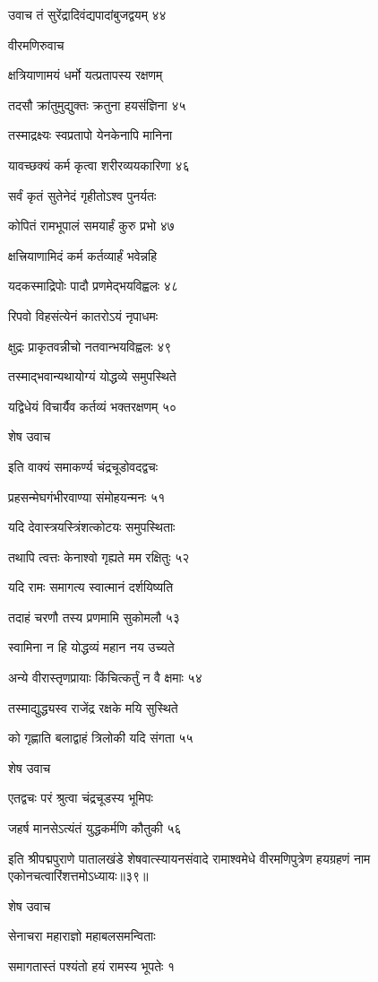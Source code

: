 उवाच तं सुरेंद्रादिवंद्यपादांबुजद्वयम् ४४

वीरमणिरुवाच

क्षत्रियाणामयं धर्मो यत्प्रतापस्य रक्षणम्

तदसौ क्रांतुमुद्युक्तः क्रतुना हयसंज्ञिना ४५

तस्माद्रक्ष्यः स्वप्रतापो येनकेनापि मानिना

यावच्छक्यं कर्म कृत्वा शरीरव्ययकारिणा ४६

सर्वं कृतं सुतेनेदं गृहीतोऽश्व पुनर्यतः

कोपितं रामभूपालं समयार्हं कुरु प्रभो ४७

क्षत्त्रियाणामिदं कर्म कर्तव्यार्हं भवेन्नहि

यदकस्माद्रिपोः पादौ प्रणमेद्भयविह्वलः ४८

रिपवो विहसंत्येनं कातरोऽयं नृपाधमः

क्षुद्रः प्राकृतवन्नीचो नतवान्भयविह्वलः ४९

तस्माद्भवान्यथायोग्यं योद्धव्ये समुपस्थिते

यद्विधेयं विचार्यैव कर्तव्यं भक्तरक्षणम् ५०

शेष उवाच

इति वाक्यं समाकर्ण्य चंद्रचूडोवदद्वचः

प्रहसन्मेघगंभीरवाण्या संमोहयन्मनः ५१

यदि देवास्त्रयस्त्रिंशत्कोटयः समुपस्थिताः

तथापि त्वत्तः केनाश्वो गृह्यते मम रक्षितुः ५२

यदि रामः समागत्य स्वात्मानं दर्शयिष्यति

तदाहं चरणौ तस्य प्रणमामि सुकोमलौ ५३

स्वामिना न हि योद्धव्यं महान नय उच्यते

अन्ये वीरास्तृणप्रायाः किंचित्कर्तुं न वै क्षमाः ५४

तस्माद्युद्ध्यस्व राजेंद्र रक्षके मयि सुस्थिते

को गृह्णाति बलाद्वाहं त्रिलोकी यदि संगता ५५

शेष उवाच

एतद्वचः परं श्रुत्वा चंद्रचूडस्य भूमिपः

जहर्ष मानसेऽत्यंतं युद्धकर्मणि कौतुकी ५६

इति श्रीपद्मपुराणे पातालखंडे शेषवात्स्यायनसंवादे रामाश्वमेधे वीरमणिपुत्रेण हयग्रहणं नाम एकोनचत्वारिंशत्तमोऽध्यायः॥३९॥


शेष उवाच

सेनाचरा महाराज्ञो महाबलसमन्विताः

समागतास्तं पश्यंतो हयं रामस्य भूपतेः १

